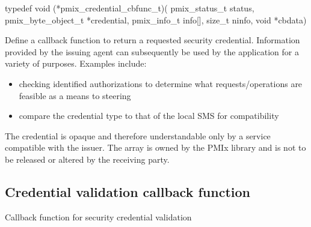 \format

\cspecificstart
\begin{codepar}
typedef void (*pmix_credential_cbfunc_t)(
                             pmix_status_t status,
                             pmix_byte_object_t *credential,
                             pmix_info_t info[], size_t ninfo,
                             void *cbdata)
\end{codepar}
\cspecificend

\begin{arglist}
\end{arglist}

\descr

Define a callback function to return a requested security credential. Information provided by the issuing agent can subsequently be used
by the application for a variety of purposes. Examples include:

\begin{itemize}
    \item checking identified authorizations to determine what requests/operations are feasible as a means to steering 
    \item compare the credential type to that of the local SMS for compatibility
\end{itemize}

\adviceuserstart
The credential is opaque and therefore understandable only by a service compatible with the issuer. The  array is owned by the \ac{PMIx} library and is not to be released or altered by the receiving party.
\adviceuserend

\subsection{Credential validation callback function}

\summary

Callback function for security credential validation

